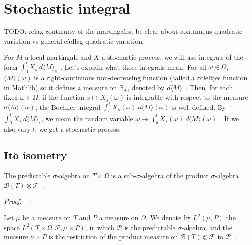 \section{Stochastic integral}

TODO: relax continuity of the martingales, be clear about continuous quadratic variation vs general càdlàg quadratic variation.

For $M$ a local martingale and $X$ a stochastic process, we will use integrals of the form $\int_0^t X_s \: d\langle M \rangle_s$~.
Let's explain what those integrals mean. For all $\omega \in \Omega$, $\langle M \rangle(\omega)$ is a right-continuous non-decreasing function (called a Stieltjes function in Mathlib) so it defines a measure on $\mathbb{R}_+$, denoted by $d\langle M \rangle$~.
Then, for each fixed $\omega \in \Omega$, if the function $s \mapsto X_s(\omega)$ is integrable with respect to the measure $d\langle M \rangle(\omega)$, the Bochner integral $\int_0^t X_s(\omega) \: d\langle M \rangle(\omega)$ is well-defined.
By $\int_0^t X_s \: d\langle M \rangle_s$, we mean the random variable $\omega \mapsto \int_0^t X_s(\omega) \: d\langle M \rangle(\omega)$~.
If we also vary $t$, we get a stochastic process.



\subsection{Itô isometry}


\begin{lemma}\label{lem:Filtration.predictable_le_prod}
  \leanok
The predictable $\sigma$-algebra on $T \times \Omega$ is a sub-$\sigma$-algebra of the product $\sigma$-algebra $\mathcal{B}(T) \otimes \mathcal{F}$~.
\end{lemma}

\begin{proof}

\end{proof}


\begin{definition}\label{def:L2Predictable}
  \leanok
Let $\mu$ be a measure on $T$ and $P$ a measure on $\Omega$.
We denote by $L^2(\mu, P)$ the space $L^2(T \times \Omega, \mathcal{P}, \mu \times P)$, in which $\mathcal{P}$ is the predictable $\sigma$-algebra, and the measure $\mu \times P$ is the restriction of the product measure on $\mathcal{B}(T) \otimes \mathcal{F}$ to $\mathcal{P}$~.
\end{definition}

